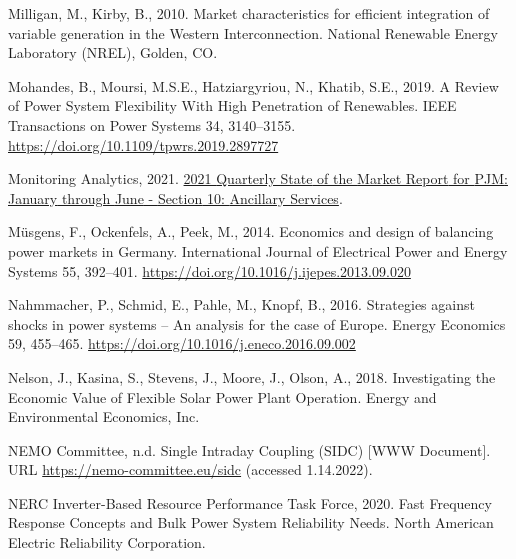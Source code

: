 \documentclass[12pt,a4paper,]{report}
\newlength{\cslhangindent}
\newenvironment{CSLReferences}[2] %
 {%
  \setlength{\parindent}{0pt}
  \ifodd #1 \everypar{\setlength{\hangindent}{\cslhangindent}}\ignorespaces\fi
  \ifnum #2 > 0
  \setlength{\parskip}{#2\baselineskip}
  \fi
 }%
 {}
\begin{document}
\begin{CSLReferences}{1}{0}
\leavevmode{}%
Milligan, M., Kirby, B., 2010. Market characteristics for efficient
integration of variable generation in the {Western Interconnection}.
{National Renewable Energy Laboratory (NREL)}, {Golden, CO}.

\leavevmode{}%
Mohandes, B., Moursi, M.S.E., Hatziargyriou, N., Khatib, S.E., 2019. A
{Review} of {Power System Flexibility With High Penetration} of
{Renewables}. IEEE Transactions on Power Systems 34, 3140--3155.
\url{https://doi.org/10.1109/tpwrs.2019.2897727}

\leavevmode{}%
Monitoring Analytics, 2021.
\href{https://www.monitoringanalytics.com/reports/PJM_State_of_the_Market/2021.shtml}{2021
{Quarterly State} of the {Market Report} for {PJM}: {January} through
{June} - {Section} 10: {Ancillary Services}}.

\leavevmode{}%
Müsgens, F., Ockenfels, A., Peek, M., 2014. Economics and design of
balancing power markets in {Germany}. International Journal of
Electrical Power and Energy Systems 55, 392--401.
\url{https://doi.org/10.1016/j.ijepes.2013.09.020}

\leavevmode{}%
Nahmmacher, P., Schmid, E., Pahle, M., Knopf, B., 2016. Strategies
against shocks in power systems -- {An} analysis for the case of
{Europe}. Energy Economics 59, 455--465.
\url{https://doi.org/10.1016/j.eneco.2016.09.002}

\leavevmode{}%
Nelson, J., Kasina, S., Stevens, J., Moore, J., Olson, A., 2018.
Investigating the {Economic Value} of {Flexible Solar Power Plant
Operation}. {Energy and Environmental Economics, Inc.}

\leavevmode{}%
NEMO Committee, n.d. Single Intraday Coupling (SIDC) {[}WWW Document{]}.
URL \url{https://nemo-committee.eu/sidc} (accessed 1.14.2022).

\leavevmode{}%
NERC Inverter-Based Resource Performance Task Force, 2020. Fast
{Frequency Response Concepts} and {Bulk Power System Reliability Needs}.
{North American Electric Reliability Corporation}.


\end{CSLReferences}
\end{document}
